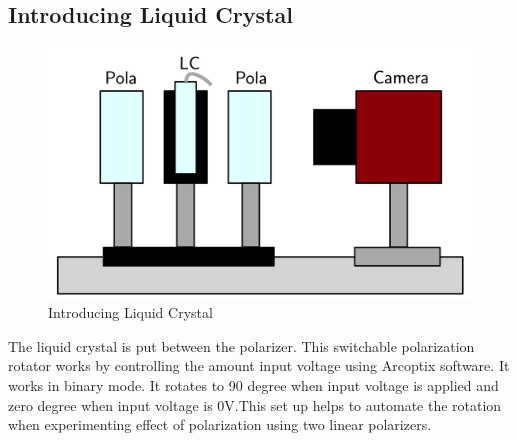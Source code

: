 \documentclass{article}
\begin{document}
	\subsection{Introducing Liquid Crystal}
	\begin{figure}[H]
	\centering
	\includegraphics[scale=0.2]{polaSetup3.png}
	\caption{Introducing Liquid Crystal}
	\end{figure}
	The liquid crystal is put between the polarizer. This switchable polarization rotator works  by controlling the amount input voltage using Arcoptix software. It works in binary mode. It rotates to 90 degree when input voltage is applied and zero degree when input voltage is 0V.This set up helps to automate the rotation when experimenting effect of polarization using two linear polarizers.
	
	
	
\end{document}
